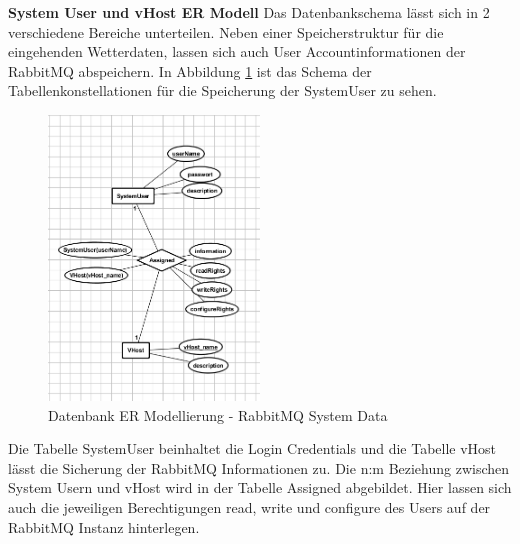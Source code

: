 \textbf{System User und vHost ER Modell}
Das Datenbankschema lässt sich in 2 verschiedene Bereiche unterteilen. Neben einer Speicherstruktur für die eingehenden Wetterdaten, lassen sich auch User Accountinformationen der RabbitMQ abspeichern. In Abbildung \ref{img:DBSchemaSystemUser} ist das Schema der Tabellenkonstellationen für die Speicherung der SystemUser zu sehen.
\begin{figure}[htbp]
	\centering
	\includegraphics[width=0.5\textwidth]{Bilder/DBSchemaSystemUser.png}
	\caption{Datenbank ER Modellierung - RabbitMQ System Data}
	\label{img:DBSchemaSystemUser}
\end{figure} 
Die Tabelle SystemUser  beinhaltet die Login Credentials und die Tabelle vHost lässt die Sicherung der RabbitMQ Informationen zu. 
Die n:m Beziehung zwischen System Usern und vHost wird in der Tabelle Assigned abgebildet. Hier lassen sich auch die jeweiligen Berechtigungen read, write und configure des Users auf der RabbitMQ Instanz hinterlegen.

